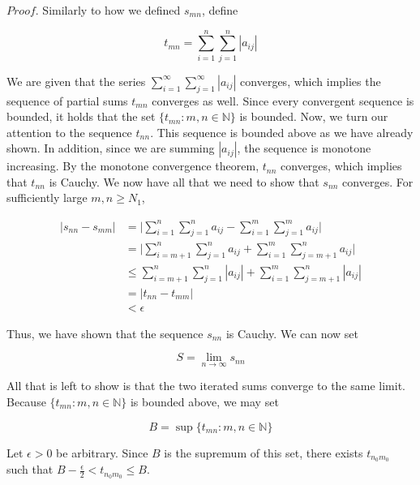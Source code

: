 \documentclass{article}
\begin{document}
$Proof.$ Similarly to how we defined $s_{mn}$, define 

\begin{equation}
    t_{mn} = \sum_{i=1}^n \sum_{j=1}^n |a_{ij}|
\end{equation}

We are given that the series $\sum_{i=1}^\infty \sum_{j=1}^\infty |a_{ij}|$ converges, which implies the sequence of partial sums $t_{mn}$ converges as well. Since every convergent sequence is bounded, it holds that the set $\{t_{mn}\colon m, n \in \mathbb{N}\}$ is bounded. Now, we turn our attention to the sequence $t_{nn}$. This sequence is bounded above as we have already shown. In addition, since we are summing $|a_{ij}|$, the sequence is monotone increasing. By the monotone convergence theorem, $t_{nn}$ converges, which implies that $t_{nn}$ is Cauchy. We now have all that we need to show that $s_{nn}$ converges. For sufficiently large $m, n \geq N_1$,

\begin{equation}
\begin{split}
    |s_{nn} - s_{mm}| &= \Bigg| \sum_{i=1}^n \sum_{j=1}^n a_{ij} - \sum_{i=1}^m \sum_{j=1}^m a_{ij}\Bigg| \\[5 mm]
    &= \Bigg| \sum_{i=m+1}^n \sum_{j=1}^n a_{ij} + \sum_{i=1}^m\sum_{j=m+1}^n a_{ij}\Bigg| \\[5 mm]
    &\leq \sum_{i=m+1}^n \sum_{j=1}^n |a_{ij}| + \sum_{i=1}^m\sum_{j=m+1}^n |a_{ij}|\\[5 mm]
    &=|t_{nn} - t_{mm}|\\[5 mm]
    &< \epsilon
\end{split}
\end{equation}

Thus, we have shown that the sequence $s_{nn}$ is Cauchy. We can now set 

\begin{equation}
    S = \lim_{n \to \infty} s_{nn}
\end{equation}

All that is left to show is that the two iterated sums converge to the same limit. Because $\{t_{mn} \colon m, n \in \mathbb{N}\}$ is bounded above, we may set 

\begin{equation}
    B = \sup \{t_{mn}\colon m, n \in \mathbb{N}\}
\end{equation}

Let $\epsilon > 0$ be arbitrary. Since $B$ is the supremum of this set, there exists $t_{n_{0}m_0}$ such that $B - \frac{\epsilon}{2} < t_{n_{0}m_0} \leq B$.\\
\end{document}
